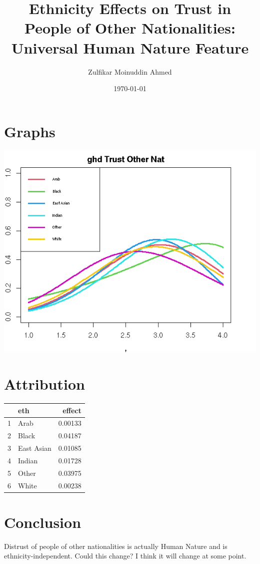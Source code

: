 \documentclass{amsart}
\title{Ethnicity Effects on Trust in People of Other Nationalities: Universal Human Nature Feature}
\author{Zulfikar Moinuddin Ahmed}
\date{\today}
\begin{document}
\maketitle

\section{Graphs}

\includegraphics[scale=0.8]{trothernat_fitted.png}

\section{Attribution}

\begin{table}[ht]
\centering
\begin{tabular}{rlr}
  \hline
 & eth & effect \\ 
  \hline
1 & Arab & 0.00133 \\ 
  2 & Black & 0.04187 \\ 
  3 & East Asian & 0.01085 \\ 
  4 & Indian & 0.01728 \\ 
  5 & Other & 0.03975 \\ 
  6 & White & 0.00238 \\ 
   \hline
\end{tabular}
\end{table}

\section{Conclusion}

Distrust of people of other nationalities is actually Human Nature and is ethnicity-independent.  Could this change?  I think it will change at some point.
\end{document}
